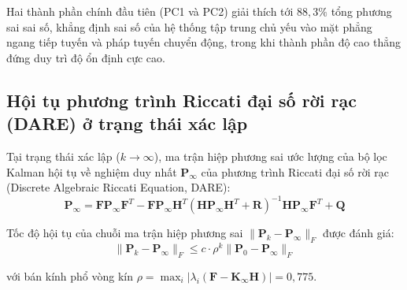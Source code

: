 Hai thành phần chính đầu tiên (PC1 và PC2) giải thích tới $88{,}3\%$ tổng phương sai sai số, khẳng định sai số của hệ thống tập trung chủ yếu vào mặt phẳng ngang tiếp tuyến và pháp tuyến chuyển động, trong khi thành phần độ cao thẳng đứng duy trì độ ổn định cực cao.

\subsection{Hội tụ phương trình Riccati đại số rời rạc (DARE) ở trạng thái xác lập}

\hspace{0.5cm} Tại trạng thái xác lập ($k \to \infty$), ma trận hiệp phương sai ước lượng của bộ lọc Kalman hội tụ về nghiệm duy nhất $\mathbf{P}_\infty$ của phương trình Riccati đại số rời rạc (Discrete Algebraic Riccati Equation, DARE):
\begin{equation}
\mathbf{P}_\infty = \mathbf{F} \mathbf{P}_\infty \mathbf{F}^T - \mathbf{F} \mathbf{P}_\infty \mathbf{H}^T \left( \mathbf{H} \mathbf{P}_\infty \mathbf{H}^T + \mathbf{R} \right)^{-1} \mathbf{H} \mathbf{P}_\infty \mathbf{F}^T + \mathbf{Q}
\label{eq:dare-riccati-equation}
\end{equation}

Tốc độ hội tụ của chuỗi ma trận hiệp phương sai $\|\mathbf{P}_k - \mathbf{P}_\infty\|_F$ được đánh giá:
\begin{equation}
\|\mathbf{P}_k - \mathbf{P}_\infty\|_F \le c \cdot \rho^k \|\mathbf{P}_0 - \mathbf{P}_\infty\|_F
\label{eq:riccati-exponential-convergence}
\end{equation}

với bán kính phổ vòng kín $\rho = \max_i |\lambda_i(\mathbf{F} - \mathbf{K}_\infty \mathbf{H})| = 0{,}775$.

\begin{table}[H]
\centering
\caption{Đo đạc quá trình hội tụ của ma trận hiệp phương sai về nghiệm Riccati xác lập $\mathbf{P}_\infty$}
\label{tab:riccati-convergence-iterations}
\end{table}

